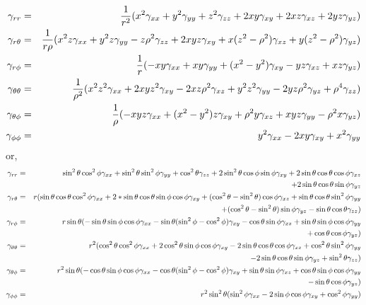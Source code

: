 \begin{eqnarray*}
  \gamma_{rr} &=&
  \frac{1}{r^2}
     (x^2\gamma_{xx}+
      y^2\gamma_{yy}+
      z^2\gamma_{zz}+
      2xy\gamma_{xy}+
      2xz\gamma_{xz}+
      2yz\gamma_{yz})
\\
  \gamma_{r\theta} &=&
  \frac{1}{r\rho}
     (x^2 z \gamma_{xx}
     +y^2 z \gamma_{yy}
     -z \rho^2 \gamma_{zz}
     +2xyz \gamma_{xy}
     +x(z^2-\rho^2)\gamma_{xz}
     +y(z^2-\rho^2)\gamma_{yz})
\\
  \gamma_{r\phi} &=&
  \frac{1}{r}
     (-xy\gamma_{xx}
      +xy\gamma_{yy}
      +(x^2-y^2)\gamma_{xy}
      -yz \gamma_{xz}
      +xz\gamma_{yz})
\\
  \gamma_{\theta\theta} &=&
  \frac{1}{\rho^2}
  (x^2z^2\gamma_{xx}
  +2xyz^2\gamma_{xy}
  -2xz\rho^2\gamma_{xz}
  +y^2z^2\gamma_{yy}
  -2yz\rho^2\gamma_{yz}
  +\rho^4\gamma_{zz})
\\
  \gamma_{\theta\phi} &=&
  \frac{1}{\rho}
  (-xyz\gamma_{xx}
   +(x^2-y^2)z\gamma_{xy}
   +\rho^2 y \gamma_{xz}
   +xyz\gamma_{yy}
   -\rho^2 x \gamma_{yz})
\\
  \gamma_{\phi\phi} &=&
   y^2\gamma_{xx}
   -2xy\gamma_{xy}
   +x^2\gamma_{yy}
\end{eqnarray*}   
or,
\begin{eqnarray*}
\gamma_{rr}&=&
\sin^2\theta\cos^2\phi\gamma_{xx}
+\sin^2\theta\sin^2\phi\gamma_{yy}
+\cos^2\theta\gamma_{zz}
+2\sin^2\theta\cos\phi\sin\phi\gamma_{xy}
+2\sin\theta\cos\theta\cos\phi\gamma_{xz}
\\
&&
+2\sin\theta\cos\theta\sin\phi\gamma_{yz}
\\
\gamma_{r\theta}&=&
r(\sin\theta\cos\theta\cos^2\phi\gamma_{xx}
+2*\sin\theta\cos\theta\sin\phi\cos\phi\gamma_{xy}
+(\cos^2\theta-\sin^2\theta)\cos\phi\gamma_{xz}
+\sin\theta\cos\theta\sin^2\phi\gamma_{yy}
\\
&&
+(\cos^2\theta-\sin^2\theta)\sin\phi\gamma_{yz}
-\sin\theta\cos\theta\gamma_{zz})
\\
\gamma_{r\phi}&=&
r\sin\theta(-\sin\theta\sin\phi\cos\phi\gamma_{xx}
-\sin\theta(\sin^2\phi-\cos^2\phi)\gamma_{xy}
-\cos\theta\sin\phi\gamma_{xz}
+\sin\theta\sin\phi\cos\phi\gamma_{yy}
\\
&&
+\cos\theta\cos\phi\gamma_{yz})
\\
\gamma_{\theta\theta}&=&
r^2(\cos^2\theta\cos^2\phi\gamma_{xx}
+2\cos^2\theta\sin\phi\cos\phi\gamma_{xy}
-2\sin\theta\cos\theta\cos\phi\gamma_{xz}
+\cos^2\theta\sin^2\phi\gamma_{yy}
\\
&&
-2\sin\theta\cos\theta\sin\phi\gamma_{yz}
+\sin^2\theta\gamma_{zz})
\\
\gamma_{\theta\phi}&=&
r^2\sin\theta(-\cos\theta\sin\phi\cos\phi\gamma_{xx}
-\cos\theta(\sin^2\phi-\cos^2\phi)\gamma_{xy}
+\sin\theta\sin\phi\gamma_{xz}
+\cos\theta\sin\phi\cos\phi\gamma_{yy}
\\
&&
-\sin\theta\cos\phi\gamma_{yz})
\\
\gamma_{\phi\phi}&=&
r^2\sin^2\theta(\sin^2\phi\gamma_{xx}
-2\sin\phi\cos\phi\gamma_{xy}
+\cos^2\phi\gamma_{yy})
\end{eqnarray*}


